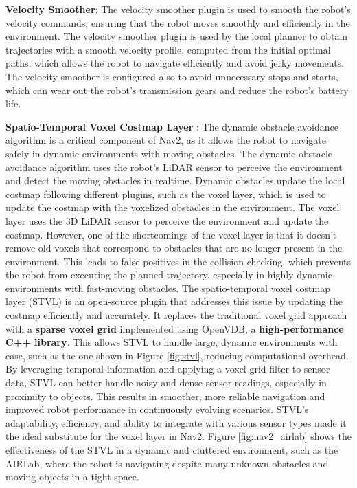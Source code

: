 \textbf{Velocity Smoother}:
The velocity smoother plugin is used to smooth the robot's velocity commands, ensuring that the robot moves smoothly
and efficiently in the environment. The velocity smoother plugin is used by the local planner to obtain
trajectories with a smooth velocity profile, computed from the initial optimal paths, which allows
the robot to navigate efficiently and avoid jerky movements. The velocity smoother is configured also to avoid
unnecessary stops and starts, which can wear out the robot's transmission gears and reduce the robot's battery life.

\textbf{Spatio-Temporal Voxel Costmap Layer} \cite{macenski2020stvl}:
The dynamic obstacle avoidance algorithm is a critical component of Nav2, as it allows the robot to navigate
safely in dynamic environments with moving obstacles. The dynamic obstacle avoidance algorithm uses the robot's LiDAR sensor
to perceive the environment and detect the moving obstacles in realtime. Dynamic obstacles update the local costmap
following different plugins, such as the voxel layer, which is used to update the costmap with the voxelized obstacles
in the environment. The voxel layer uses the 3D LiDAR sensor to perceive the environment and update the costmap.
However, one of the shortcomings of the voxel layer is that it doesn't remove old voxels that correspond to obstacles
that are no longer present in the environment. This leads to false positives in the collision checking, which prevents
the robot from executing the planned trajectory, especially in highly dynamic environments with fast-moving obstacles.
The spatio-temporal voxel costmap layer (STVL) is an open-source plugin that addresses this issue by updating the costmap
efficiently and accurately. It replaces the traditional voxel grid approach with a \textbf{sparse voxel grid} implemented
using OpenVDB, a \textbf{high-performance C++ library}. This allows STVL to handle large, dynamic environments with ease,
such as the one shown in Figure \ref{fig:stvl}, 
reducing computational overhead. By leveraging temporal information and applying a voxel grid filter to sensor data,
STVL can better handle noisy and dense sensor readings, especially in proximity to objects. 
This results in smoother, more reliable navigation and improved robot performance in continuously evolving scenarios.
STVL's adaptability, efficiency, and ability to integrate with various sensor types made it the ideal substitute
for the voxel layer in Nav2. Figure \ref{fig:nav2_airlab} shows the effectiveness of the STVL in a dynamic
and cluttered environment, such as the AIRLab, where the robot is navigating despite many unknown obstacles 
and moving objects in a tight space.

